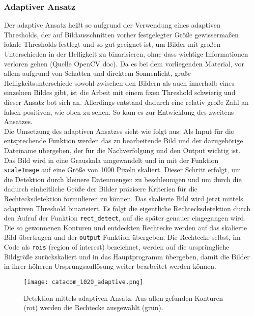 \subsubsection*{Adaptiver Ansatz}
Der adaptive Ansatz heißt so aufgrund der Verwendung eines adaptiven Thresholds, der auf Bildausschnitten vorher festgelegter Größe gewissermaßen lokale Thresholds festlegt und so gut geeignet ist, um Bilder mit großen Unterschieden in der Helligkeit zu binarisieren, ohne dass wichtige Informationen verloren gehen (Quelle OpenCV doc). Da es bei dem vorliegenden Material, vor allem aufgrund von Schatten und direktem Sonnenlicht, große Helligkeitsunterschiede sowohl zwischen den Bildern als auch innerhalb eines einzelnen Bildes gibt, ist die Arbeit mit einem fixen Threshold schwierig und dieser Ansatz bot sich an. Allerdings entstand dadurch eine relativ große Zahl an falsch-positiven, wie oben zu sehen. So kam es zur Entwicklung des zweitens Ansatzes.\\
Die Umsetzung des adaptiven Ansatzes sieht wie folgt aus:
Als Input für die entsprechende Funktion werden das zu bearbeitende Bild und der dazugehörige Dateiname übergeben, der für die Nachverfolgung und den Output wichtig ist. Das Bild wird in eine Grauskala umgewandelt und in mit der Funktion \verb|scaleImage| auf eine Größe von 1000 Pixeln skaliert. Dieser Schritt erfolgt, um die Detektion durch kleinere Datenmengen zu beschleunigen und um durch die dadurch einheitliche Größe der Bilder präzisere Kriterien für die Rechtecksdetektion formulieren zu können. Das skalierte Bild wird jetzt mittels adaptiven Threshold binarisiert. Es folgt die eigentliche Rechtecksdetektion durch den Aufruf der Funktion \verb|rect_detect|, auf die später genauer eingegangen wird. Die so gewonnenen Konturen und entdeckten Rechtecke werden auf das skalierte Bild übertragen und der \verb|output|-Funktion übergeben. Die Rechtecke selbst, im Code als \verb|rois| (region of interest) bezeichnet, werden auf die ursprüngliche Bildgröße zurückskaliert und in das Hauptprogramm übergeben, damit die Bilder in ihrer höheren Ursprungsauflösung weiter bearbeitet werden können.
\begin{SCfigure}[1][h!]
\caption{Detektion mittels adaptiven Ansatz: Aus allen gefunden Konturen (rot) werden die Rechtecke ausgewählt (grün).}
\texttt{[image: catacom\_1020\_adaptive.png]}
\end{SCfigure}

